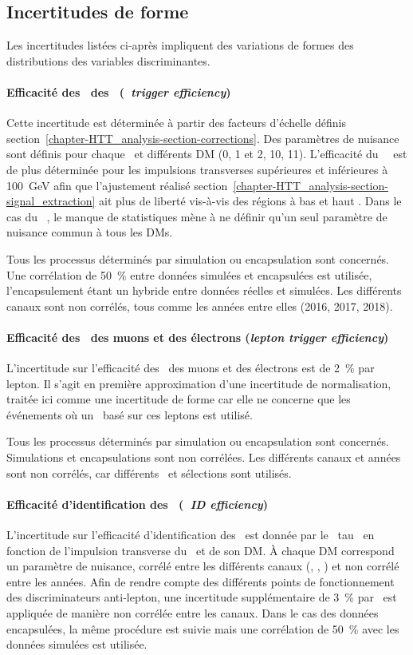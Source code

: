 \subsection{Incertitudes de forme}\label{chapter-HTT_analysis-section-systematics-shapes}
Les incertitudes listées ci-après impliquent des variations de formes des distributions des variables discriminantes.
\paragraph{Efficacité des \HLTpaths\ des \tauh\ (\emph{\tauh\ trigger efficiency})}
Cette incertitude est déterminée à partir des facteurs d'échelle définis section~\ref{chapter-HTT_analysis-section-corrections}.
Des paramètres de nuisance sont définis pour chaque \HLTpath\ et différents DM (0, 1 et 2, 10, 11).
L'efficacité du \HLTpath\ \HLTDoubleTau\ est de plus déterminée pour les impulsions transverses supérieures et inférieures à \SI{100}{\GeV} afin que l'ajustement réalisé section~\ref{chapter-HTT_analysis-section-signal_extraction} ait plus de liberté vis-à-vis des régions à bas et haut \pT.
Dans le cas du \HLTpath\ \HLTSingleTau, le manque de statistiques mène à ne définir qu'un seul paramètre de nuisance commun à tous les DMs.
\par
Tous les processus déterminés par simulation ou encapsulation sont concernés.
Une corrélation de \SI{50}{\%} entre données simulées et encapsulées est utilisée, l'encapsulement étant un hybride entre données réelles et simulées.
Les différents canaux sont non corrélés, tous comme les années entre elles (2016, 2017, 2018).
\paragraph{Efficacité des \HLTpaths\ des muons et des électrons (\emph{lepton trigger efficiency})}
L'incertitude sur l'efficacité des \HLTpaths\ des muons et des électrons est de \SI{2}{\%} par lepton.
Il s'agit en première approximation d'une incertitude de normalisation, traitée ici comme une incertitude de forme car elle ne concerne que les événements où un \HLTpath\ basé sur ces leptons est utilisé.
\par
Tous les processus déterminés par simulation ou encapsulation sont concernés.
Simulations et encapsulations sont non corrélées.
Les différents canaux et années sont non corrélés, car différents \HLTpaths\ et sélections sont utilisés.
\paragraph{Efficacité d'identification des \tauh\ (\emph{\tauh\ ID efficiency})}
L'incertitude sur l'efficacité d'identification des \tauh\ est donnée par le \POG\ tau~\cite{TauPOG}
en fonction de l'impulsion transverse du \tauh\ et de son DM.
À chaque DM correspond un paramètre de nuisance, corrélé entre les différents canaux (\tauh\tauh, \mu\tauh, \ele\tauh) et non corrélé entre les années.
Afin de rendre compte des différents points de fonctionnement des discriminateurs anti-lepton, une incertitude supplémentaire de \SI{3}{\%} par \tauh\ est appliquée de manière non corrélée entre les canaux.
Dans le cas des données encapsulées, la même procédure est suivie mais une corrélation de \SI{50}{\%} avec les données simulées est utilisée.
